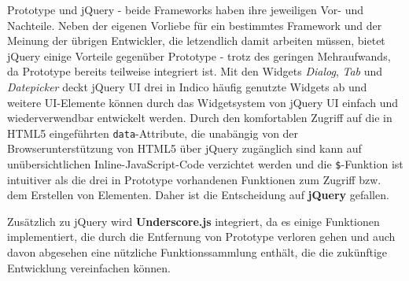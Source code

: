 Prototype und jQuery - beide Frameworks haben ihre jeweiligen Vor- und Nachteile. Neben der eigenen
Vorliebe für ein bestimmtes Framework und der Meinung der übrigen Entwickler, die letzendlich damit
arbeiten müssen, bietet jQuery einige Vorteile gegenüber Prototype - trotz des geringen
Mehraufwands, da Prototype bereits teilweise integriert ist. Mit den Widgets \emph{Dialog},
\emph{Tab} und \emph{Datepicker} deckt jQuery UI drei in Indico häufig genutzte Widgets ab und
weitere UI-Elemente können durch das Widgetsystem von jQuery UI einfach und wiederverwendbar
entwickelt werden. Durch den komfortablen Zugriff auf die in HTML5 eingeführten
\lstinline{data}-Attribute, die unabängig von der Browserunterstützung von HTML5 über jQuery
zugänglich sind kann auf unübersichtlichen Inline-JavaScript-Code verzichtet werden und die
\lstinline{$}-Funktion ist intuitiver als die drei in Prototype vorhandenen Funktionen zum Zugriff
bzw. dem Erstellen von Elementen. Daher ist die Entscheidung auf \textbf{jQuery} gefallen.

Zusätzlich zu jQuery wird \textbf{Underscore.js} integriert, da es einige Funktionen implementiert,
die durch die Entfernung von Prototype verloren gehen und auch davon abgesehen eine nützliche
Funktionssammlung enthält, die die zukünftige Entwicklung vereinfachen können.
